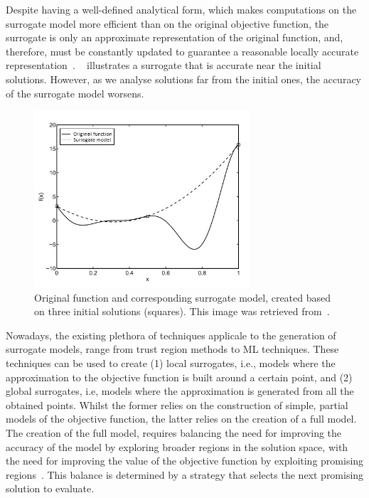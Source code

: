 	Despite having a well-defined analytical form, which makes computations on the surrogate model more efficient than on the original objective function, the surrogate is only an approximate representation of the original function, and, therefore, must be constantly updated to guarantee a reasonable locally accurate representation~\cite{Koziel2011}. ~ illustrates a surrogate that is accurate near the initial solutions. However, as we analyse solutions far from the initial ones, the accuracy of the surrogate model worsens.
	
	\begin{figure}
	\centering
	\includegraphics[width=8cm]{Images/Background/sbosexample.JPG}
	\caption[Example of a surrogate model]{Original function and corresponding surrogate model, created based on three initial solutions (squares). This image was retrieved from~\cite{Koziel2011}.}
	\label{fig:sbosexample}
	\end{figure}
	
	Nowadays, the existing plethora of techniques applicale to the generation of surrogate models, range from trust region methods to \ac{ML} techniques. These techniques can be used to create (1) local surrogates, i.e., models where the approximation to the objective function is built around a certain point, and (2) global surrogates, i.e, models where the approximation is generated from all the obtained points. Whilst the former relies on the construction of simple, partial models of the objective function, the latter relies on the creation of a full model. The creation of the full model, requires balancing the need for improving the accuracy of the model by exploring broader regions in the solution space, with the need for improving the value of the objective function by exploiting promising regions~\cite{Koziel2011}. This balance is determined by a strategy that selects the next promising solution to evaluate.
	
